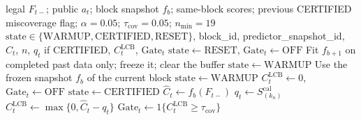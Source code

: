 \documentclass[letterpaper,journal]{IEEEtran}
\begin{document}
\begin{algorithm}[t]
\caption{Aggregate coverage certificate (diagnostic Gate)}
\label{alg:agg_certificate}
\begin{algorithmic}[1]
\REQUIRE legal $F_{t-}$; public $a_t$; block snapshot $f_b$; same-block scores;
previous CERTIFIED miscoverage flag; $\alpha=0.05$; $\tau_{\mathrm{cov}}=0.05$; $n_{\min}=19$
\ENSURE $\mathrm{state}\in\{\mathrm{WARMUP},\mathrm{CERTIFIED},\mathrm{RESET}\}$,
block\_id, predictor\_snapshot\_id, $\widehat C_t$, $n$, $q_t$ if CERTIFIED,
$C^{\mathrm{LCB}}_t$, $\mathrm{Gate}_t$
\STATE $\mathrm{state}\leftarrow\mathrm{RESET}$, $\mathrm{Gate}_t\leftarrow\mathrm{OFF}$
\STATE Fit $f_{b+1}$ on completed past data only; freeze it; clear the buffer
\STATE $\mathrm{state}\leftarrow\mathrm{WARMUP}$
\ELSE
\STATE Use the frozen snapshot $f_b$ of the current block
\STATE $\mathrm{state}\leftarrow\mathrm{WARMUP}$
\STATE $C^{\mathrm{LCB}}_t\leftarrow 0$, $\mathrm{Gate}_t\leftarrow\mathrm{OFF}$
\ELSE
\STATE $\mathrm{state}\leftarrow\mathrm{CERTIFIED}$ 
\STATE $\widehat C_t\leftarrow f_b(F_{t-})$
\STATE $q_t\leftarrow S_{(k_n)}^{\mathrm{cal}}$ 
\STATE $C^{\mathrm{LCB}}_t\leftarrow\max\{0,\widehat C_t-q_t\}$
\STATE $\mathrm{Gate}_t\leftarrow 1\{C^{\mathrm{LCB}}_t\ge\tau_{\mathrm{cov}}\}$
\ENDIF
\ENDIF
\end{algorithmic}
\end{algorithm}
\end{document}
